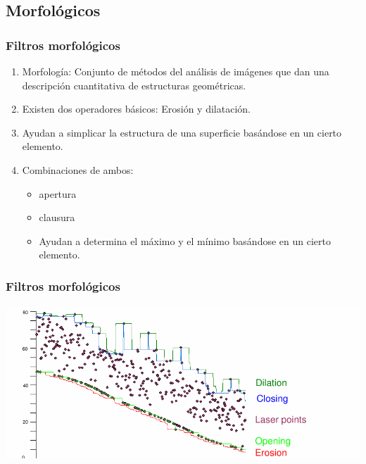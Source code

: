 \subsection{Morfológicos}
\begin{frame}
  \frametitle{Filtros morfológicos}
  \begin{enumerate}
    \item<1-> \alert{Morfología}: Conjunto de métodos del análisis de imágenes que
      dan una descripción cuantitativa de estructuras geométricas.
    \item<2-> Existen dos operadores básicos: \alert{Erosión} y \alert{dilatación}.
    \item<2-> Ayudan a simplicar la estructura de una superficie basándose en un
      cierto elemento.
    \item<3-> Combinaciones de ambos:
      \begin{itemize}
        \item<3-> \alert{apertura}
        \item<3-> \alert{clausura}
        \item<6-> Ayudan a determina el máximo y el mínimo basándose en un cierto elemento.
      \end{itemize}
  \end{enumerate}
\end{frame}
\begin{frame}
  \frametitle{Filtros morfológicos}
  \begin{center}
    \includegraphics[height=0.70\textheight]{images/morfologia}
  \end{center}
\end{frame}
